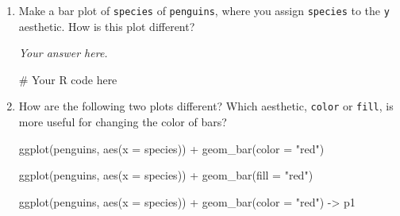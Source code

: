 \documentclass[
  letterpaper,
  DIV=11,
  numbers=noendperiod]{scrreprt}
\newenvironment{Shaded}{\begin{snugshade}}{\end{snugshade}}
\newcommand{\AttributeTok}[1]{\textcolor[rgb]{0.40,0.45,0.13}{#1}}
\newcommand{\CommentTok}[1]{\textcolor[rgb]{0.37,0.37,0.37}{#1}}
\newcommand{\FunctionTok}[1]{\textcolor[rgb]{0.28,0.35,0.67}{#1}}
\newcommand{\NormalTok}[1]{\textcolor[rgb]{0.00,0.23,0.31}{#1}}
\newcommand{\OtherTok}[1]{\textcolor[rgb]{0.00,0.23,0.31}{#1}}
\newcommand{\SpecialCharTok}[1]{\textcolor[rgb]{0.37,0.37,0.37}{#1}}
\newcommand{\StringTok}[1]{\textcolor[rgb]{0.13,0.47,0.30}{#1}}
\begin{document}
\begin{enumerate}
\begin{tcolorbox}
  \end{tcolorbox}
\item
  Make a bar plot of \texttt{species} of \texttt{penguins}, where you
  assign \texttt{species} to the \texttt{y} aesthetic. How is this plot
  different?

  \begin{tcolorbox}[enhanced jigsaw, breakable, bottomtitle=1mm, left=2mm, colback=white, toprule=.15mm, leftrule=.75mm, colframe=quarto-callout-note-color-frame, colbacktitle=quarto-callout-note-color!10!white, title={Answer}, coltitle=black, toptitle=1mm, bottomrule=.15mm, opacitybacktitle=0.6, arc=.35mm, rightrule=.15mm, titlerule=0mm, opacityback=0]

  \emph{Your answer here.}

\begin{Shaded}
\begin{Highlighting}[]
\CommentTok{\# Your R code here}
\end{Highlighting}
\end{Shaded}

  \end{tcolorbox}
\item
  How are the following two plots different? Which aesthetic,
  \texttt{color} or \texttt{fill}, is more useful for changing the color
  of bars?

\begin{Shaded}
\begin{Highlighting}[]
\FunctionTok{ggplot}\NormalTok{(penguins, }\FunctionTok{aes}\NormalTok{(}\AttributeTok{x =}\NormalTok{ species)) }\SpecialCharTok{+}
  \FunctionTok{geom\_bar}\NormalTok{(}\AttributeTok{color =} \StringTok{"red"}\NormalTok{)}

\FunctionTok{ggplot}\NormalTok{(penguins, }\FunctionTok{aes}\NormalTok{(}\AttributeTok{x =}\NormalTok{ species)) }\SpecialCharTok{+}
  \FunctionTok{geom\_bar}\NormalTok{(}\AttributeTok{fill =} \StringTok{"red"}\NormalTok{)}
\end{Highlighting}
\end{Shaded}

  \begin{tcolorbox}[enhanced jigsaw, breakable, bottomtitle=1mm, left=2mm, colback=white, toprule=.15mm, leftrule=.75mm, colframe=quarto-callout-note-color-frame, colbacktitle=quarto-callout-note-color!10!white, title={Answer}, coltitle=black, toptitle=1mm, bottomrule=.15mm, opacitybacktitle=0.6, arc=.35mm, rightrule=.15mm, titlerule=0mm, opacityback=0]

\begin{Shaded}
\begin{Highlighting}[]
\FunctionTok{ggplot}\NormalTok{(penguins, }\FunctionTok{aes}\NormalTok{(}\AttributeTok{x =}\NormalTok{ species)) }\SpecialCharTok{+}
    \FunctionTok{geom\_bar}\NormalTok{(}\AttributeTok{color =} \StringTok{"red"}\NormalTok{) }\OtherTok{{-}\textgreater{}}\NormalTok{ p1}


\end{Highlighting}
\end{Shaded}
\end{tcolorbox}
\end{enumerate}
\end{document}
